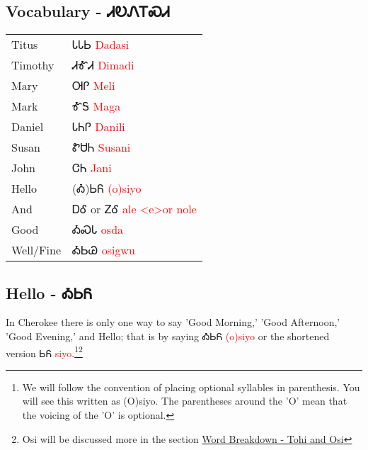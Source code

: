 {\subsection{Vocabulary - ᏗᎧᏁᎢᏍᏗ 
}
\begin{tabular}{p{3cm} p{11cm}}
Titus & ᏓᏓᏏ 
 \newline \textcolor{red}{Dadasi}\\
Timothy & ᏗᎹᏗ 
 \newline \textcolor{red}{Dimadi}\\
Mary & ᎺᎵ 
 \newline \textcolor{red}{Meli}\\
Mark & ᎹᎦ 
 \newline \textcolor{red}{Maga}\\
Daniel & ᏓᏂᎵ 
 \newline \textcolor{red}{Danili}\\
Susan & ᏑᏌᏂ 
 \newline \textcolor{red}{Susani}\\
John & ᏣᏂ 
 \newline \textcolor{red}{Jani}\\
Hello & (Ꭳ)ᏏᏲ 
 \newline \textcolor{red}{(o)siyo}\\
And & ᎠᎴ 
  or ᏃᎴ 
 \newline \textcolor{red}{ale <e>or nole}\\
Good & ᎣᏍᏓ 
 \newline \textcolor{red}{osda}\\
Well/Fine & ᎣᏏᏊ 
 \newline \textcolor{red}{osigwu}\\
\end{tabular}

\subsection{Hello - ᎣᏏᏲ}
In Cherokee there is only one way to say 'Good Morning,' 'Good Afternoon,' 'Good Evening,' and Hello; that is by saying ᎣᏏᏲ \textcolor{red}{(o)siyo} or the shortened version ᏏᏲ \textcolor{red}{siyo}.\footnote{We will follow the convention of placing optional syllables in parenthesis.  You will see this written as (O)siyo.  The parentheses around the 'O' mean that the voicing of the 'O' is optional.}\footnote{Osi will be discussed more in the section \hyperref[sec:wordBreakdownTohiOsi]{Word Breakdown - Tohi and Osi}}
}
